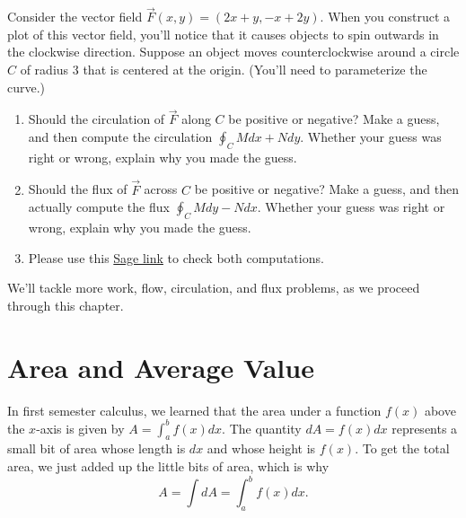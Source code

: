 \begin{problem}
%
 Consider the vector field $\vec F(x,y) = (2x+y,-x+2y)$. When you construct a plot of this vector field, you'll notice that it causes objects to spin outwards in the clockwise direction. Suppose an object moves counterclockwise around a circle $C$ of radius 3 that is centered at the origin. (You'll need to parameterize the curve.)
\begin{enumerate}
 \item Should the circulation of $\vec F$ along $C$ be positive or negative?  Make a guess, and then compute the circulation $\oint_C Mdx+Ndy$. Whether your guess was right or wrong, explain why you made the guess. 
 \item Should the flux of $\vec F$ across $C$ be positive or negative? Make a guess, and then actually compute the flux $\oint_C Mdy-Ndx$. Whether your guess was right or wrong, explain why you made the guess. 
 \item Please use this \href{\sageworkfluxurl}{Sage link} to check both computations. 
\end{enumerate}
\end{problem}

We'll tackle more work, flow, circulation, and flux problems, as we proceed through this chapter.














\section{Area and Average Value}

In first semester calculus, we learned that the area under a function $f(x)$ above the $x$-axis is given by $A = \int_a^b f(x) dx$.  The quantity $dA= f(x) dx$ represents a small bit of area whose length is $dx$ and whose height is $f(x)$.  To get the total area, we just added up the little bits of area, which is why 
$$A=\int dA = \int_a^b f(x) dx.$$


